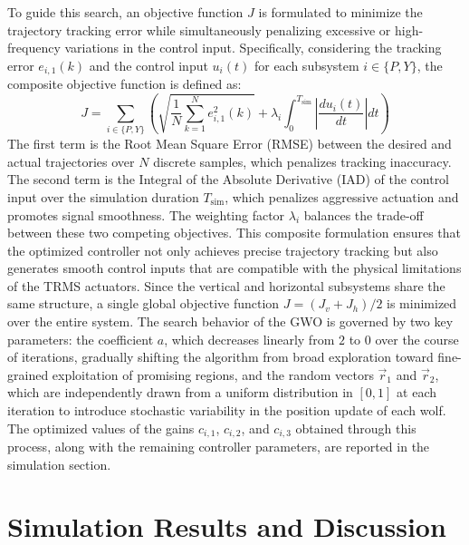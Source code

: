 To guide this search, an objective function $J$ is formulated to minimize the trajectory tracking error while simultaneously penalizing excessive or high-frequency variations in the control input. Specifically, considering the tracking error $e_{i,1}(k)$ and the control input $u_i(t)$ for each subsystem $i \in \{P, Y\}$, the composite objective function is defined as:
\begin{equation}
    J = \sum_{i \in \{P, Y\}} \left( \sqrt{\frac{1}{N} \sum_{k=1}^{N} e_{i,1}^2(k)} + \lambda_i \int_{0}^{T_{\text{sim}}} \left| \frac{du_i(t)}{dt} \right| dt \right)
    \label{eq:global_cost_function}
\end{equation}
The first term is the Root Mean Square Error (RMSE) between the desired and actual trajectories over $N$ discrete samples, which penalizes tracking inaccuracy. The second term is the Integral of the Absolute Derivative (IAD) of the control input over the simulation duration $T_{\text{sim}}$, which penalizes aggressive actuation and promotes signal smoothness. The weighting factor $\lambda_i$ balances the trade-off between these two competing objectives. This composite formulation ensures that the optimized controller not only achieves precise trajectory tracking but also generates smooth control inputs that are compatible with the physical limitations of the TRMS actuators. Since the vertical and horizontal subsystems share the same structure, a single global objective function $J = (J_v + J_h)/2$ is minimized over the entire system. The search behavior of the GWO is governed by two key parameters: the coefficient $a$, which decreases linearly from $2$ to $0$ over the course of iterations, gradually shifting the algorithm from broad exploration toward fine-grained exploitation of promising regions, and the random vectors $\vec{r}_1$ and $\vec{r}_2$, which are independently drawn from a uniform distribution in $[0, 1]$ at each iteration to introduce stochastic variability in the position update of each wolf. The optimized values of the gains $c_{i,1}$, $c_{i,2}$, and $c_{i,3}$ obtained through this process, along with the remaining controller parameters, are reported in the simulation section.

\section{Simulation Results and Discussion}
\label{sec:trms_results}

